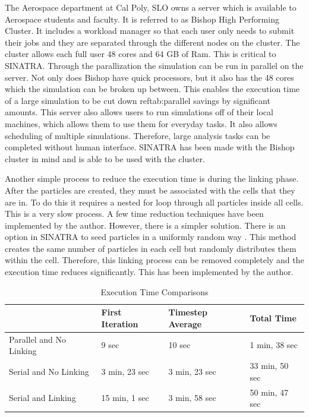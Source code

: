 \indent The Aerospace department at Cal Poly, SLO owns a server which is available to Aerospace students and faculty. It is referred to as Bishop High Performing Cluster\cite{hpc}. It includes a workload manager so that each user only needs to submit their jobs and they are separated through the different nodes on the cluster. The cluster allows each full user 48 cores and 64 GB of Ram\cite{hpc}. This is critical to SINATRA. Through the parallization the simulation can be run in parallel on the server. Not only does Bishop have quick processors, but it also has the 48 cores which the simulation can be broken up between. This enables the execution time of a large simulation to be cut down ref{tab:parallel savings} by significant amounts. This server also allows users to run simulations off of their local machines, which allows them to use them for everyday tasks. It also allows scheduling of multiple simulations. Therefore, large analysis tasks can be completed without human interface. SINATRA has been made with the Bishop cluster in mind and is able to be used with the cluster. 



\indent Another simple process to reduce the execution time is during the linking phase. After the particles are created, they must be associated with the cells that they are in. To do this it requires a nested for loop through all particles inside all cells. This is a very slow process. A few time reduction techniques have been implemented by the author. However, there is a simpler solution. There is an option in SINATRA to seed particles in a uniformly random way \cite{Galvez2018a}. This method creates the same number of particles in each cell but randomly distributes them within the cell. Therefore, this linking process can be removed completely and the execution time reduces significantly. This has been implemented by the author. \par

\begin{table}
\label{tab:Timing}
\caption{Execution Time Comparisons}
\vspace{0.3cm}
\begin{center}
\begin{tabular}{|l|l|l|l|}
\hline
                             & First Iteration & Timestep Average & Total Time     \\ \hline
Parallel and No Linking & 9 sec           & 10 sec           & 1 min, 38 sec  \\ \hline
Serial and No Linking   & 3 min, 23 sec   & 3 min, 23 sec    & 33 min, 50 sec \\ \hline
Serial and Linking      & 15 min, 1 sec   &  3 min, 58 sec   &   50 min, 47 sec             \\ \hline
\end{tabular}
\end{center}
\end{table}

